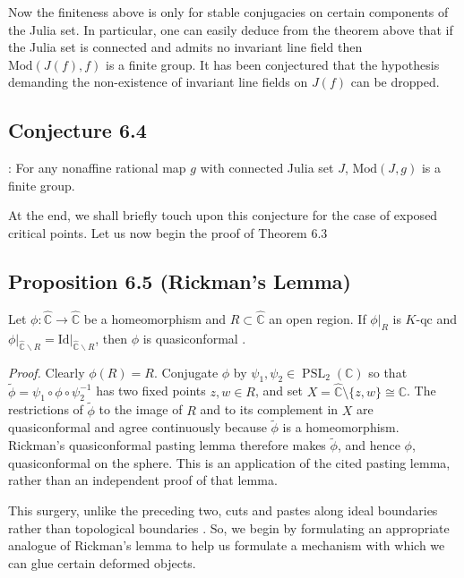 \documentclass[11pt,a4paper]{article}
\begin{document}

    Now the finiteness above is only for stable conjugacies on certain components of the Julia set. In particular, one can easily deduce from the theorem above that if the Julia set is connected and admits no invariant line field then $\text{Mod}(J(f), f)$ is a finite group. It has been conjectured that the hypothesis demanding the non-existence of invariant line fields on $J(f)$ can be dropped.

    \subsection*{Conjecture 6.4}: For any nonaffine rational map $g$ with connected Julia set $J$, $\text{Mod}(J, g)$ is a finite group.


    At the end, we shall briefly touch upon this conjecture for the case of exposed critical points. Let us now begin the proof of Theorem $6.3$

    \subsection*{Proposition 6.5 (Rickman's Lemma)} Let $\phi:\hat{\mathbb{C}}\rightarrow\hat{\mathbb{C}}$ be a homeomorphism and $R\subset\hat{\mathbb{C}}$ an open region. If $\phi\big|_R$ is $K$-qc and $\phi\big|_{\hat{\mathbb{C}}\backslash R} = \text{Id}\big|_{\hat{\mathbb{C}}\backslash R}$, then $\phi$ is quasiconformal \cite{mcmullen1988automorphisms}.

    \textit{Proof.} Clearly $\phi(R)=R$. Conjugate $\phi$ by $\psi_1,\psi_2\in\operatorname{PSL}_2(\mathbb C)$ so that $\widetilde\phi=\psi_1\circ\phi\circ\psi_2^{-1}$ has two fixed points $z,w\in R$, and set $X=\hat{\mathbb C}\setminus\{z,w\}\cong\mathbb C$. The restrictions of $\widetilde\phi$ to the image of $R$ and to its complement in $X$ are quasiconformal and agree continuously because $\widetilde\phi$ is a homeomorphism. Rickman's quasiconformal pasting lemma therefore makes $\widetilde\phi$, and hence $\phi$, quasiconformal on the sphere. This is an application of the cited pasting lemma, rather than an independent proof of that lemma.



    This surgery, unlike the preceding two, cuts and pastes along ideal boundaries rather than topological boundaries \cite{mcmullen1988automorphisms,branner2014quasiconformal}. So, we begin by formulating an appropriate analogue of Rickman's lemma to help us formulate a mechanism with which we can glue certain deformed objects.
\end{document}
